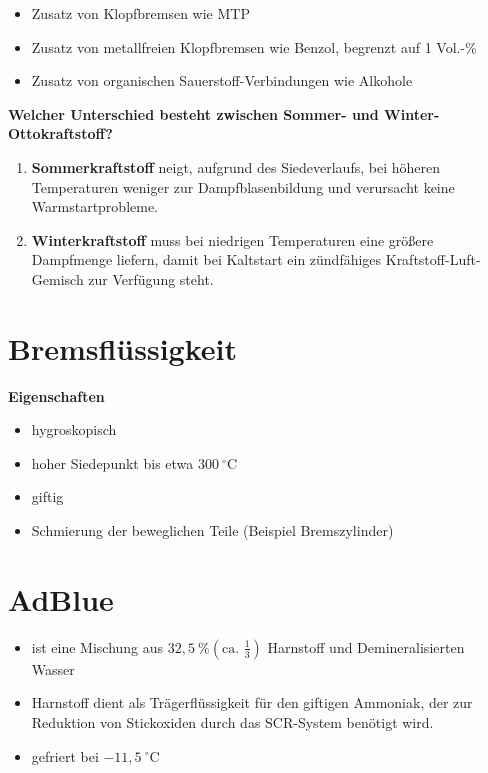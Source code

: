 \begin{enumerate}
  \begin{itemize}
  \item
    Zusatz von Klopfbremsen wie MTP
  \item
    Zusatz von metallfreien Klopfbremsen wie Benzol, begrenzt auf 1
    Vol.-\%
  \item
    Zusatz von organischen Sauerstoff-Verbindungen wie Alkohole
  \end{itemize}
\end{enumerate}

\textbf{Welcher Unterschied besteht zwischen Sommer- und
Winter-Ottokraftstoff?}

\begin{enumerate}
\item
  \textbf{Sommerkraftstoff} neigt, aufgrund des Siedeverlaufs, bei
  höheren Temperaturen weniger zur Dampfblasenbildung und verursacht
  keine Warmstartprobleme.
\item
  \textbf{Winterkraftstoff} muss bei niedrigen Temperaturen eine größere
  Dampfmenge liefern, damit bei Kaltstart ein zündfähiges
  Kraftstoff-Luft-Gemisch zur Verfügung steht.
\end{enumerate}

\section{Bremsflüssigkeit}\label{bremsfluessigkeit}

\textbf{Eigenschaften}

\begin{itemize}
\item
  hygroskopisch
\item
  hoher Siedepunkt bis etwa $300~^\circ\text{C}$
\item
  giftig
\item
  Schmierung der beweglichen Teile (Beispiel Bremszylinder)
\end{itemize}

\section{AdBlue}\label{adblue}

\begin{itemize}
\item
  ist eine Mischung aus $32,5~\% (\text{ca. } \frac{1}{3})$ Harnstoff
  und Demineralisierten Wasser
\item
  Harnstoff dient als Trägerflüssigkeit für den giftigen Ammoniak, der
  zur Reduktion von Stickoxiden durch das SCR-System benötigt wird.
\item
  gefriert bei $- 11,5~^\circ\text{C}$
\end{itemize}

